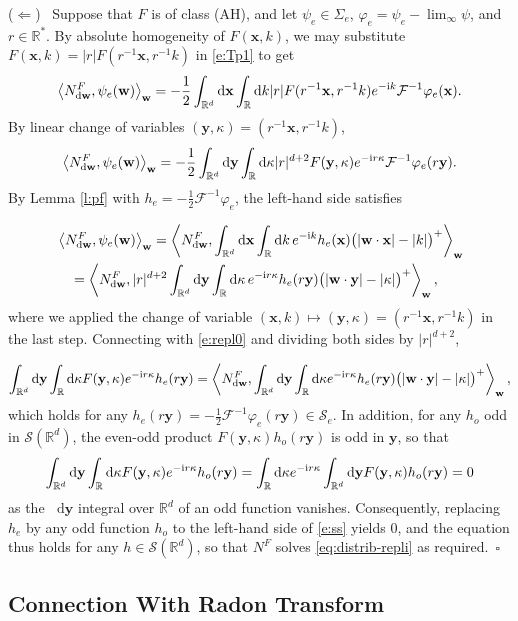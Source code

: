 \documentclass[11pt,A4,twoside]{article}
\numberwithin{equation}{section}
\renewcommand{\b}[1]{{\color{blue}#1}}
\renewcommand{\vec}{\mathbf}
\newcommand{\Fi}{\mathcal{F}^{-1}}
\renewcommand*\d{\mathop{}\!\mathrm{d}}
\newcommand{\norm}[1]{\left|#1 \right|}
\newcommand{\inner}[1]{\left\langle#1 \right\rangle}
\renewcommand{\k}{\kappa}
\newcommand{\x}{\mathbf{x}}
\newcommand{\y}{\mathbf{y}}
\newcommand{\w}{\mathbf{w}}
\newcommand{\R}{\mathbbm{R}}
\renewcommand{\S}{\mathcal{S}}
\newcommand{\M}{\Sigma}
\newcommand{\intRd}{\int_{\R^d}}
\newcommand{\intR}{\int_{\R}}
\newcommand{\beqa}{\begin{eqnarray}}
\newcommand{\eeqa}{\end{eqnarray}}
\def\bal{\begin{aligned}}
\def\eal{\end{aligned}}
\def\bll#1{
\beqa\label{#1}\bal
}\def\lel{\eal\eeqa}
\newcommand{\beql}[1]{\bll{#1}}
\newcommand{\eeql}{\lel}
\theoremstyle{definition}
\theoremstyle{remark}
\def\AHl{{\rm AHa}\xspace}\def\AHl{{\rm (AH)}\xspace}
\def\R{\mathbb{R}}
\def\varphie{\varphi_e}
\def\finproof {$\Box$ \vskip 5 pt }\def\finproof{\rule{4pt}{6pt}}\def\finproof{\ensuremath{\square}}
\def\theh{\b{h}}\def\theh{h}
\def\thermi{{\rm i}}%
\begin{document}
\noindent ($\Leftarrow$)~%
Suppose that $F$ is of class \AHl, and
let $\psi_e\in \M_e$, $\varphie = \psi_e - \lim_{\pmb{\infty}} \psi$, and $r \in \R^*$. By absolute homogeneity of $F(\vec x, k)$, we may substitute $F(\vec x, k) = \norm r F(r^{-1}\x, r^{-1}k)$ in \eqref{e:Tp1} to get
\[
     \inner{N^F_{\d \w},\psi_e (\w) }_{\w}
    = -\frac{1}{2}\intRd \d \x \intR \d k |r| F(r^{-1}\x, r^{-1} k) e^{-\thermi k} \Fi \varphie(\x).
\]
By linear change of variables $(\y,\kappa)=(r^{-1}\x,r^{-1} k)$,
\begin{align}   \label{e:repl0}
     \inner{N^F_{\d \w},\psi_e (\w) }_{\w}
    = 
    -\frac{1}{2}\intRd \d \y \intR \d \kappa |r|^{d+2}F(\y,\kappa) e^{-\thermi  r\kappa} \Fi \varphie(r\y).
\end{align} 
By Lemma \ref{l:pf} with $ \theh_e =-\frac{1}{2} \Fi \varphie$, the left-hand side satisfies
\beql{e:repl}
&  \inner{N^F_{\d \w},\psi_e (\w)  }_{\w}=
  \inner{N^F_{\d \w}, \intRd \d\x \int_\R  \d k  \,  e^{-\thermi k} \theh_e(\x)  \big(|\w\cdot\x| -| k|\big)^+    }_{\w}\\
  &\quad=  \inner{N^F_{\d \w},|r|^{d+2} \intRd \d\y \int_\R  \d \kappa  \,  e^{-\thermi  r\kappa} \theh_e(r\y)  \big(|\w\cdot\y| -| \kappa|\big)^+    }_{\w},
\eeql  
where we applied the change of variable $(\x,k)\mapsto (\y,\kappa)=(r^{-1}\x,r^{-1} k)$ in the last step.  Connecting with \eqref{e:repl0} and dividing both sides by $\norm r^{d+2}$,
\beql{e:ss}
\intRd \d \y \intR \d \kappa F(\y,\kappa) e^{-\thermi  r\k} \theh_e(r\y) = \inner{N^F_{\d \w},\intRd \d \y \intR \d \k e^{-\thermi  r\k} \theh_e(r\y)  \big(|\w\cdot\y| -| \k|\big)^+  }_{\w},
\eeql
which holds for any $\theh_e(r\y) = -\frac{1}{2} \Fi \varphie( r\y ) \in\S_e$. In addition, for any $\theh_o$ odd in $\mathcal{S}(\R^d)$, the even-odd product $F(\y,\kappa)h_o(r\y)$ is odd in $\y$, so that
\[
    \intRd \d \y \intR \d \k F(\y,\k) e^{-\thermi  r\k} \theh_o(r\y)   
    = \intR \d \k e^{-\thermi  r\k} \intRd \d \y F(\y,\k)  \theh_o(r\y)   
    = 0
\]
as the $\d\y$ integral over $\R^d$ of an odd function vanishes.
Consequently, replacing $\theh_e$ by any odd function $\theh_o$ to the left-hand side of \eqref{e:ss} yields 0, and the equation thus holds for any $\theh \in \S (\R^d)$, so that $N^F$ solves \eqref{eq:distrib-repli} as required.\ \finproof 

\subsection{Connection With Radon Transform}\label{ss:radon}
\end{document}
